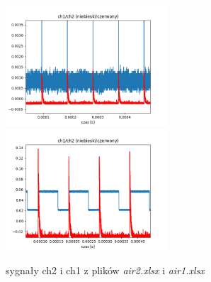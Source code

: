 \documentclass[10pt,a4paper]{article}
\begin{document}
\begin{figure}[h]
    \centering
    \includegraphics[width=6cm]{pictures/ch2_1.png}
    \includegraphics[width=6cm]{pictures/ch2_2.png}
    \caption{sygnały ch2 i ch1 z plików \textit{air2.xlsx}  i \textit{air1.xlsx}}
    \label{ch2_1}
\end{figure}
\end{document}
